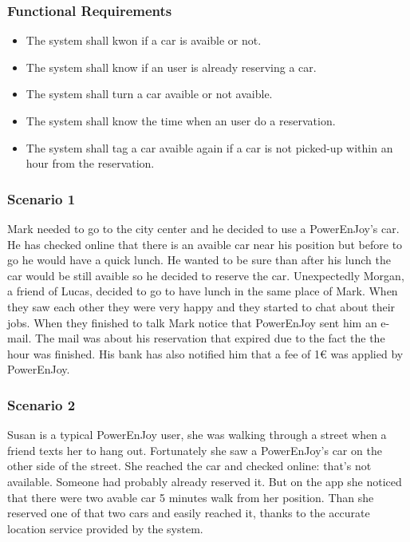 \subsubsection{Functional Requirements}
\begin{itemize}
  \item The system shall kwon if a car is avaible or not.
  \item The system shall know if an user is already reserving a car.
  \item The system shall turn a car avaible or not avaible.
  \item The system shall know the time when an user do a reservation.
  \item The system shall tag a car avaible again if a car is not picked-up within an hour from the reservation.
\end{itemize}

\subsubsection{Scenario 1}
Mark needed to go to the city center and he decided to use a PowerEnJoy's car. He has checked online that there is an avaible car near his position but before to go he would have a quick lunch. He wanted to be sure than after his lunch the car would be still avaible so he decided to reserve the car.
Unexpectedly Morgan, a friend of Lucas, decided to go to have lunch in the same place of Mark. When they saw each other they were very happy and they started to chat about their jobs. When they finished to talk Mark notice that PowerEnJoy sent him an e-mail. The mail was about his reservation that expired due to the fact the the hour was finished. His bank has also notified him that a fee of 1€ was applied by PowerEnJoy.


\subsubsection{Scenario 2}
Susan is a typical PowerEnJoy user, she was walking through a street when a friend texts her to hang out. Fortunately she saw a PowerEnJoy's car on the other side of the street. She reached the car and checked online: that's not available. Someone had probably already reserved it. But on the app she noticed that there were two avable car 5 minutes walk from her position. Than she reserved one of that two cars and easily reached it, thanks to the accurate location service provided by the system. 


